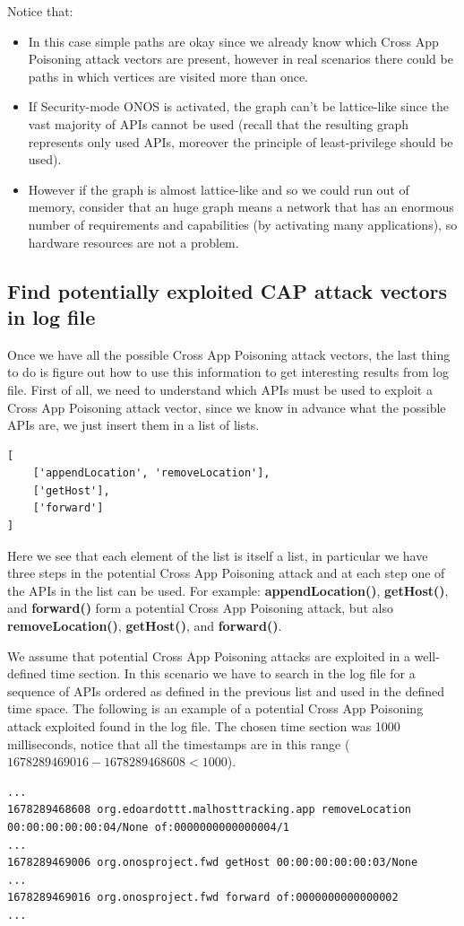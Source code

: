 Notice that:
\begin{itemize}
    \item In this case simple paths are okay since we already know which Cross App Poisoning attack vectors are present, however in real scenarios there could be paths in which vertices are visited more than once. 
    \item If Security-mode ONOS is activated, the graph can't be lattice-like since the vast majority of APIs cannot be used (recall that the resulting graph represents only used APIs, moreover the principle of least-privilege should be used).
    \item However if the graph is almost lattice-like and so we could run out of memory, consider that an huge graph means a network that has an enormous number of requirements and capabilities (by activating many applications), so hardware resources are not a problem.
\end{itemize}

\subsection{Find potentially exploited CAP attack vectors in log file}
Once we have all the possible Cross App Poisoning attack vectors, the last thing to do is figure out how to use this information to get interesting results from log file. First of all, we need to understand which APIs must be used to exploit a Cross App Poisoning attack vector, since we know in advance what the possible APIs are, we just insert them in a list of lists.
\begin{lstlisting}[]
[
    ['appendLocation', 'removeLocation'], 
    ['getHost'], 
    ['forward']
]
\end{lstlisting}
Here we see that each element of the list is itself a list, in particular we have three steps in the potential Cross App Poisoning attack and at each step one of the APIs in the list can be used. For example: \textbf{appendLocation()}, \textbf{getHost()}, and \textbf{forward()} form a potential Cross App Poisoning attack, but also \textbf{removeLocation()}, \textbf{getHost()}, and \textbf{forward()}.
\medskip

We assume that potential Cross App Poisoning attacks are exploited in a well-defined time section. In this scenario we have to search in the log file for a sequence of APIs ordered as defined in the previous list and used in the defined time space. The following is an example of a potential Cross App Poisoning attack exploited found in the log file. The chosen time section was 1000 milliseconds, notice that all the timestamps are in this range ($1678289469016-1678289468608 < 1000$).
\begin{lstlisting}[]
...
1678289468608 org.edoardottt.malhosttracking.app removeLocation 00:00:00:00:00:04/None of:0000000000000004/1
...
1678289469006 org.onosproject.fwd getHost 00:00:00:00:00:03/None
...
1678289469016 org.onosproject.fwd forward of:0000000000000002
...
\end{lstlisting}

